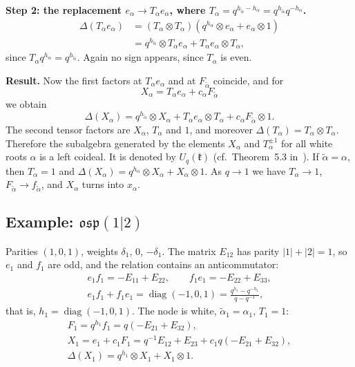 \documentclass[12pt,a4paper]{article}
\newcommand{\kk}{\mathfrak{k}}
\newcommand{\osp}{\mathfrak{osp}}
\newcommand{\Uq}{U_q}
\newcommand{\ta}{\tilde\alpha}
\newcommand{\ot}{\otimes}
\newcommand{\diag}{\operatorname{diag}}
\begin{document}
\textbf{Step 2: the replacement $e_\alpha\to T_\alpha e_\alpha$, where $T_\alpha=q^{h_{\ta}-h_\alpha}=q^{h_{\ta}}q^{-h_\alpha}$.}
\begin{align*}
\Delta(T_\alpha e_\alpha)&=(T_\alpha\ot T_\alpha)(q^{h_\alpha}\ot e_\alpha+e_\alpha\ot1)\\
&=q^{h_{\ta}}\ot T_\alpha e_\alpha+T_\alpha e_\alpha\ot T_\alpha ,
\end{align*}
since $T_\alpha q^{h_\alpha}=q^{h_{\ta}}$. Again no sign appears, since $T_\alpha$ is even.

\textbf{Result.} Now the first factors at $T_\alpha e_\alpha$ and at $F_{\ta}$ coincide, and for
\begin{equation}\label{eq:X}
X_\alpha=T_\alpha e_\alpha+c_\alpha F_{\ta}
\end{equation}
we obtain
\begin{equation}\label{eq:DX}
\Delta(X_\alpha)=q^{h_{\ta}}\ot X_\alpha+T_\alpha e_\alpha\ot T_\alpha+c_\alpha F_{\ta}\ot1 .
\end{equation}
The second tensor factors are $X_\alpha$, $T_\alpha$ and $1$, and moreover $\Delta(T_\alpha)=T_\alpha\ot T_\alpha$. Therefore the subalgebra generated by the elements $X_\alpha$ and $T_\alpha^{\pm1}$ for all white roots $\alpha$ is a left coideal. It
is denoted by $\Uq(\kk)$ (cf.\ Theorem~5.3 in~\cite{AMS}). If $\ta=\alpha$, then $T_\alpha=1$ and
$\Delta(X_\alpha)=q^{h_\alpha}\ot X_\alpha+X_\alpha\ot1$. As $q\to1$ we have $T_\alpha\to1$, $F_{\ta}\to f_{\ta}$, and
$X_\alpha$ turns into $x_\alpha$.



\subsection{Example: $\osp(1|2)$}
Parities $(1,0,1)$, weights $\delta_1$, $0$, $-\delta_1$. The matrix $E_{12}$ has parity $|1|+|2|=1$, so $e_1$ and $f_1$ are odd, and the relation contains an anticommutator:
\begin{gather*}
e_1f_1=-E_{11}+E_{22},\qquad f_1e_1=-E_{22}+E_{33},\\
e_1f_1+f_1e_1=\diag(-1,0,1)=\frac{q^{h_1}-q^{-h_1}}{q-q^{-1}},
\end{gather*}
that is, $h_1=\diag(-1,0,1)$. The node is white, $\ta_1=\alpha_1$, $T_1=1$:
\begin{gather*}
F_1=q^{h_1}f_1=q(-E_{21}+E_{32}),\\
X_1=e_1+c_1F_1=q^{-1}E_{12}+E_{23}+c_1q(-E_{21}+E_{32}),\\
\Delta(X_1)=q^{h_1}\ot X_1+X_1\ot1 .
\end{gather*}
\end{document}
